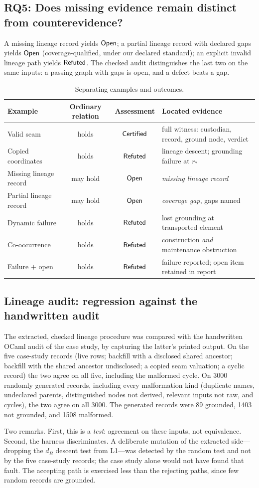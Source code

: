 \subsection{RQ5: Does missing evidence remain distinct from counterevidence?}
A missing lineage record yields $\mathsf{Open}$; a partial lineage record with declared gaps yields $\mathsf{Open}$ (coverage-qualified, under our declared standard); an explicit invalid lineage path yields $\mathsf{Refuted}$. The checked audit distinguishes the last two on the same inputs: a passing graph with gaps is open, and a defect beats a gap.

\begin{table}[t]
\centering\small
\caption{Separating examples and outcomes.}\label{tab:examples}
\begin{tabularx}{\textwidth}{@{}lccY@{}}
\toprule
Example & Ordinary relation & Assessment & Located evidence \\
\midrule
Valid seam & holds & $\mathsf{Certified}$ & full witness: custodian, record, ground node, verdict \\
Copied coordinates & holds & $\mathsf{Refuted}$ & lineage descent; grounding failure at $r_*$ \\
Missing lineage record & may hold & $\mathsf{Open}$ & \textit{missing lineage record} \\
Partial lineage record & may hold & $\mathsf{Open}$ & \textit{coverage gap}, gaps named \\
Dynamic failure & holds & $\mathsf{Refuted}$ & lost grounding at transported element \\
Co-occurrence & holds & $\mathsf{Refuted}$ & construction \emph{and} maintenance obstruction \\
Failure $+$ open & holds & $\mathsf{Refuted}$ & failure reported; open item retained in report \\
\bottomrule
\end{tabularx}
\end{table}

\subsection{Lineage audit: regression against the handwritten audit}
The extracted, checked lineage procedure was compared with the handwritten OCaml audit of the case study, by capturing the latter's printed output. On the five case-study records (live rows; backfill with a disclosed shared ancestor; backfill with the shared ancestor undisclosed; a copied seam valuation; a cyclic record) the two agree on all five, including the malformed cycle. On 3000 randomly generated records, including every malformation kind (duplicate names, undeclared parents, distinguished nodes not derived, relevant inputs not raw, and cycles), the two agree on all 3000. The generated records were 89 grounded, 1403 not grounded, and 1508 malformed.

Two remarks. First, this is a \emph{test}: agreement on these inputs, not equivalence. Second, the harness discriminates. A deliberate mutation of the extracted side---dropping the $d_B$ descent test from L1---was detected by the random test and not by the five case-study records; the case study alone would not have found that fault. The accepting path is exercised less than the rejecting paths, since few random records are grounded.
